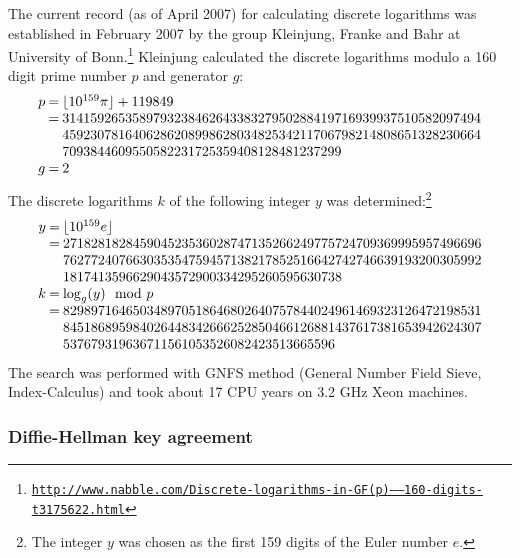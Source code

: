 The current record (as of April 2007) for calculating discrete logarithms was
established in February 2007 by the group Kleinjung, Franke and Bahr at
University of Bonn.\footnote{%
   \href{http://www.nabble.com/Discrete-logarithms-in-GF(p)-----160-digits-t3175622.html}
{\texttt{http://www.nabble.com/Discrete-logarithms-in-GF(p)-----160-digits-t3175622.html}}}
Kleinjung calculated the discrete logarithms modulo a 160 digit prime number $p$
and generator $g$:
$$
\begin{array}{r@{\:}c@{\:}l}
p & = & \lfloor 10^{159}\pi\rfloor + 119849 \\
  & = & 314159265358979323846264338327950288419716939937510582097494 \\
  &   & 459230781640628620899862803482534211706798214808651328230664 \\
  &   & 7093844609550582231725359408128481237299\\
g & = & 2
\end{array}
$$
The discrete logarithms $k$ of the following integer $y$ was
determined:\footnote{The integer $y$ was chosen as the first 159 digits of the
Euler number $e$.}
$$
\begin{array}{r@{\:}c@{\:}l}
y & = & \lfloor 10^{159}e\rfloor \\
  & = & 271828182845904523536028747135266249775724709369995957496696 \\
  &   & 762772407663035354759457138217852516642742746639193200305992 \\
  &   & 1817413596629043572900334295260595630738 \\
k & = & \log_g(y)\mod p\\
  & = & 829897164650348970518646802640757844024961469323126472198531 \\
&   & 845186895984026448342666252850466126881437617381653942624307 \\
&   & 537679319636711561053526082423513665596
\end{array}
$$
The search was performed with GNFS method (General Number Field Sieve,
Index-Calculus)  and took about 17 CPU
years on 3.2 GHz Xeon machines.

\subsubsection[Diffie-Hellman key agreement]
{Diffie-Hellman key agreement\footnotemark}

